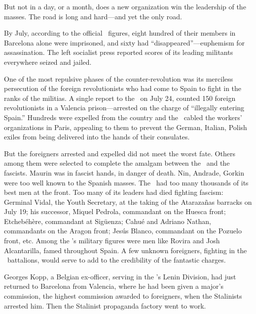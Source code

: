 
\medskip

But not in a day, or a month, does a new organization win the leadership of the masses. The road is long and hard---and yet the only road.

\dinkus

By July, according to the official \CNT\ figures, eight hundred of their members in Barcelona alone were imprisoned, and sixty had ``disappeared''---euphemism for assassination. The left socialist press reported scores of its leading militants everywhere seized and jailed.

One of the most repulsive phases of the counter-revolution was its merciless persecution of the foreign revolutionists who had come to Spain to fight in the ranks of the militias. A single report to the \CNT\ on July 24, counted 150 foreign revolutionists in a Valencia prison---arrested on the charge of ``illegally entering Spain.'' Hundreds were expelled from the country and the \CNT\ cabled the workers’ organizations in Paris, appealing to them to prevent the German, Italian, Polish exiles from being delivered into the hands of their consulates.

But the foreigners arrested and expelled did not meet the worst fate. Others among them were selected to complete the amalgam between the \POUM\ and the fascists. Maurin was in fascist hands, in danger of death. Nin, Andrade, Gorkin were too well known to the Spanish masses. The \POUM\ had too many thousands of its best men at the front. Too many of its leaders had died fighting fascism: Germinal Vidal, the Youth Secretary, at the taking of the Atarazañas barracks on July 19; his successor, Miquel Pedrola, commandant on the Huesca front; Etcheb\'eh\`ere, commandant at Sig\"uenza; Cahué and Adriano Nathan, commandants on the Aragon front; Jes\'us Blanco, commandant on the Pozuelo front, etc. Among the \POUM’s military figures were men like Rovira and Josh Alcantarilla, famed throughout Spain. A few unknown foreigners, fighting in the \POUM\ battalions, would serve to add to the credibility of the fantastic charges.

Georges Kopp, a Belgian ex-officer, serving in the \POUM’s Lenin Division, had just returned to Barcelona from Valencia, where he had been given a major’s commission, the highest commission awarded to foreigners, when the Stalinists arrested him.
Then the Stalinist propaganda factory went to work.

